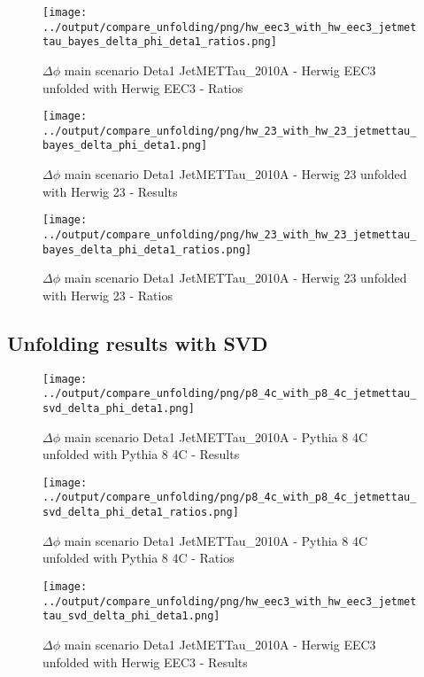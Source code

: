 \documentclass[11pt]{book}
\begin{document}
\begin{figure}[ht]
\centering
\texttt{[image: ../output/compare\_unfolding/png/hw\_eec3\_with\_hw\_eec3\_jetmettau\_bayes\_delta\_phi\_deta1\_ratios.png]}
\caption{$\Delta\phi$ main scenario Deta1 JetMETTau\_2010A - Herwig EEC3 unfolded with Herwig EEC3 - Ratios}
\label{hw_eec3_hw_eec3_jetmettau_bayes_delta_phi_deta1_b}
\end{figure}

\begin{figure}[ht]
\centering
\texttt{[image: ../output/compare\_unfolding/png/hw\_23\_with\_hw\_23\_jetmettau\_bayes\_delta\_phi\_deta1.png]}
\caption{$\Delta\phi$ main scenario Deta1 JetMETTau\_2010A - Herwig 23 unfolded with Herwig 23 - Results}
\label{hw_23_hw_23_jetmettau_bayes_delta_phi_deta1_a}
\end{figure}

\begin{figure}[ht]
\centering
\texttt{[image: ../output/compare\_unfolding/png/hw\_23\_with\_hw\_23\_jetmettau\_bayes\_delta\_phi\_deta1\_ratios.png]}
\caption{$\Delta\phi$ main scenario Deta1 JetMETTau\_2010A - Herwig 23 unfolded with Herwig 23 - Ratios}
\label{hw_23_hw_23_jetmettau_bayes_delta_phi_deta1_b}
\end{figure}



\clearpage
\subsection{Unfolding results with SVD}
\begin{figure}[ht]
\centering
\texttt{[image: ../output/compare\_unfolding/png/p8\_4c\_with\_p8\_4c\_jetmettau\_svd\_delta\_phi\_deta1.png]}
\caption{$\Delta\phi$ main scenario Deta1 JetMETTau\_2010A - Pythia 8 4C unfolded with Pythia 8 4C - Results}
\label{p8_p8_jetmettau_svd_delta_phi_deta1_a}
\end{figure}

\begin{figure}[ht]
\centering
\texttt{[image: ../output/compare\_unfolding/png/p8\_4c\_with\_p8\_4c\_jetmettau\_svd\_delta\_phi\_deta1\_ratios.png]}
\caption{$\Delta\phi$ main scenario Deta1 JetMETTau\_2010A - Pythia 8 4C unfolded with Pythia 8 4C - Ratios}
\label{p8_p8_jetmettau_svd_delta_phi_deta1_b}
\end{figure}

\begin{figure}[ht]
\centering
\texttt{[image: ../output/compare\_unfolding/png/hw\_eec3\_with\_hw\_eec3\_jetmettau\_svd\_delta\_phi\_deta1.png]}
\caption{$\Delta\phi$ main scenario Deta1 JetMETTau\_2010A - Herwig EEC3 unfolded with Herwig EEC3 - Results}
\label{hw_eec3_hw_eec3_jetmettau_svd_delta_phi_deta1_a}
\end{figure}
\end{document}
